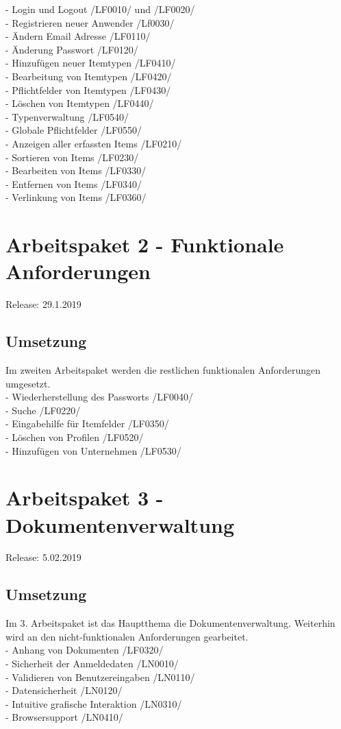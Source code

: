 \documentclass[11pt,a4paper]{report}
\begin{document}
- Login und Logout /LF0010/ und /LF0020/  \\
- Registrieren neuer Anwender /Lf0030/ \\
- Ändern Email Adresse /LF0110/ \\
- Änderung Passwort /LF0120/ \\
- Hinzufügen neuer Itemtypen /LF0410/ \\
- Bearbeitung von Itemtypen /LF0420/ \\
- Pflichtfelder von Itemtypen /LF0430/ \\
- Löschen von Itemtypen /LF0440/ \\
- Typenverwaltung /LF0540/ \\
- Globale Pflichtfelder /LF0550/ \\
- Anzeigen aller erfassten Items /LF0210/ \\
- Sortieren von Items /LF0230/ \\
- Bearbeiten von Items /LF0330/ \\
- Entfernen von Items /LF0340/ \\
- Verlinkung von Items /LF0360/ \\

\section{Arbeitspaket 2 - Funktionale Anforderungen }
Release: 29.1.2019 \\
\subsection{Umsetzung}
Im zweiten Arbeitspaket werden die restlichen funktionalen Anforderungen umgesetzt.\\
- Wiederherstellung des Passworts /LF0040/ \\
- Suche /LF0220/ \\
- Eingabehilfe für Itemfelder /LF0350/ \\
- Löschen von Profilen /LF0520/ \\
- Hinzufügen von Unternehmen /LF0530/ \\
\newpage

\section{Arbeitspaket 3 - Dokumentenverwaltung}
Release: 5.02.2019 \\
\subsection{Umsetzung}
Im 3. Arbeitspaket ist das Hauptthema die Dokumentenverwaltung. Weiterhin wird an den nicht-funktionalen Anforderungen gearbeitet. \\
- Anhang von Dokumenten /LF0320/ \\
- Sicherheit der Anmeldedaten /LN0010/ \\
- Validieren von Benutzereingaben /LN0110/ \\
- Datensicherheit /LN0120/ \\
- Intuitive grafische Interaktion /LN0310/ \\
- Browsersupport /LN0410/ \\
\end{document}
